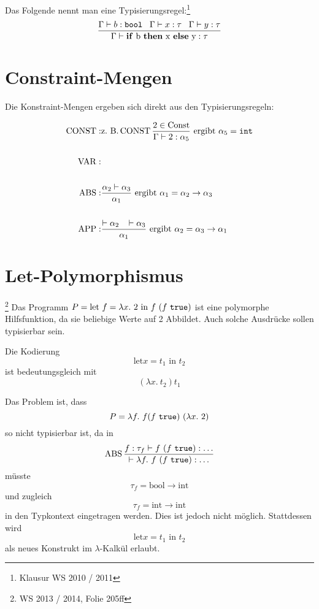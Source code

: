 \begin{beispiel}[Typisierungsregel]%
	Das Folgende nennt man eine Typisierungsregel:\footnote{Klausur WS 2010 / 2011}
	\[\frac{\Gamma \vdash b: \text{\texttt{bool}}\;\;\; \Gamma \vdash x: \tau \;\;\; \Gamma \vdash y: \tau }{\Gamma \vdash \text{\textbf{if} b \textbf{then} x \textbf{else} y} : \tau}\]
\end{beispiel}

\section{Constraint-Mengen}
Die Konstraint-Mengen ergeben sich direkt aus den Typisierungsregeln:

    \begin{align*}
        \operatorname{CONST}:&\text{z.~B.} \operatorname{CONST} \frac{2 \in \text{Const}}{\Gamma \vdash 2 : \alpha_5} \text{ ergibt } \alpha_5 = \text{\texttt{int}}\\
               &\\
        \operatorname{VAR}:  &\\
               &\\
        \operatorname{ABS}:  &\frac{\alpha_2 \vdash \alpha_3}{\alpha_1} \text{ ergibt } \alpha_1 = \alpha_2 \rightarrow \alpha_3\\
               &\\
        \operatorname{APP}:  &\frac{\vdash \alpha_2 \;\;\; \vdash \alpha_3}{\alpha_1} \text{ ergibt } \alpha_2 = \alpha_3 \rightarrow \alpha_1\\
    \end{align*}

\section{Let-Polymorphismus}\footnote{WS 2013 / 2014, Folie 205ff}%
Das Programm $P = \text{let } f = \lambda x.\ 2 \text{ in } f\ (f\ \text{\texttt{true}})$
ist eine polymorphe Hilfsfunktion, da sie beliebige Werte auf 2 Abbildet.
Auch solche Ausdrücke sollen typisierbar sein.

Die Kodierung 
\[\text{let} x = t_1 \text{ in } t_2\]
ist bedeutungsgleich mit
\[(\lambda x.\ t_2) t_1\]

Das Problem ist, dass 
\[P = \lambda f. \ f (f\ \text{\texttt{true}})\ (\lambda x.\ 2)\]
so nicht typisierbar ist, da in
\[\ABS \frac{f: \tau_f \vdash f\ (f\ \text{\texttt{true}}): \dots}{\vdash \lambda f.\ f\ (f\ \text{\texttt{true}}): \dots}\]
müsste 
\[\tau_f = \text{bool} \rightarrow \text{int}\]
und zugleich
\[\tau_f = \text{int} \rightarrow \text{int}\]
in den Typkontext eingetragen werden. Dies ist jedoch nicht möglich. Stattdessen
wird 
\[\text{let} x = t_1 \text{ in } t_2\]
als neues Konstrukt im $\lambda$-Kalkül erlaubt.

